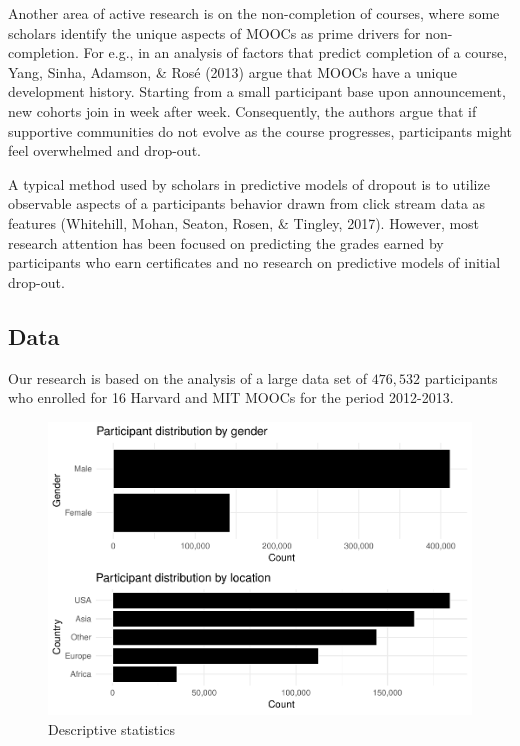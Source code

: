 \documentclass[12pt,]{article}
\begin{document}
Another area of active research is on the non-completion of courses,
where some scholars identify the unique aspects of MOOCs as prime
drivers for non-completion. For e.g., in an analysis of factors that
predict completion of a course, Yang, Sinha, Adamson, \& Rosé (2013)
argue that MOOCs have a unique development history. Starting from a
small participant base upon announcement, new cohorts join in week after
week. Consequently, the authors argue that if supportive communities do
not evolve as the course progresses, participants might feel overwhelmed
and drop-out.

A typical method used by scholars in predictive models of dropout is to
utilize observable aspects of a participants behavior drawn from click
stream data as features (Whitehill, Mohan, Seaton, Rosen, \& Tingley,
2017). However, most research attention has been focused on predicting
the grades earned by participants who earn certificates and no research
on predictive models of initial drop-out.

\subsection{Data}\label{data}

Our research is based on the analysis of a large data set of \(476,532\)
participants who enrolled for 16 Harvard and MIT MOOCs for the period
2012-2013.

\begin{figure}[p]

{\centering \includegraphics[width=1\linewidth]{initial-draft_files/figure-latex/unnamed-chunk-5-1} 

}

\caption{Descriptive statistics \label{descriptive_plots}}\label{fig:unnamed-chunk-5}
\end{figure}
\end{document}
